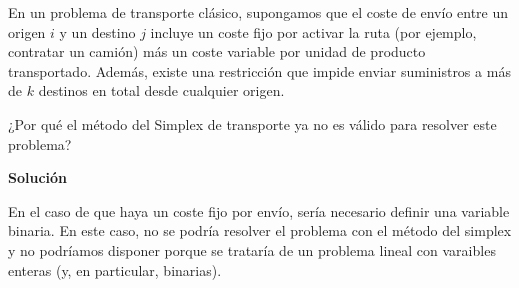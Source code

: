 En un problema de transporte clásico, supongamos que el coste de envío entre un origen $i$ y un destino $j$ incluye un coste fijo por activar la ruta (por ejemplo, contratar un camión) más un coste variable por unidad de producto transportado. Además, existe una restricción que impide enviar suministros a más de $k$ destinos en total desde cualquier origen. 

¿Por qué el método del Simplex de transporte ya no es válido para resolver este problema?

\textbf{Solución}

En el caso de que haya un coste fijo por envío, sería necesario definir una variable binaria. En este caso, no se podría resolver el problema con el método del simplex y no podríamos disponer porque se trataría de un problema lineal con varaibles enteras (y, en particular, binarias).
